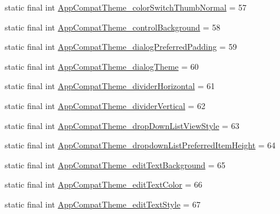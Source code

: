\begin{DoxyCompactItemize}
\item 
static final int \mbox{\hyperlink{classandroid_1_1support_1_1v7_1_1appcompat_1_1_r_1_1styleable_a4a54d43ed55ed2c6a48476ab524d2ec6}{App\+Compat\+Theme\+\_\+color\+Switch\+Thumb\+Normal}} = 57
\item 
static final int \mbox{\hyperlink{classandroid_1_1support_1_1v7_1_1appcompat_1_1_r_1_1styleable_a1459b42a4639cb7d3dee1500ad41f746}{App\+Compat\+Theme\+\_\+control\+Background}} = 58
\item 
static final int \mbox{\hyperlink{classandroid_1_1support_1_1v7_1_1appcompat_1_1_r_1_1styleable_ac445010ed6737b533f69751345cdacae}{App\+Compat\+Theme\+\_\+dialog\+Preferred\+Padding}} = 59
\item 
static final int \mbox{\hyperlink{classandroid_1_1support_1_1v7_1_1appcompat_1_1_r_1_1styleable_a811594124b056b626c7b3d35fe15c677}{App\+Compat\+Theme\+\_\+dialog\+Theme}} = 60
\item 
static final int \mbox{\hyperlink{classandroid_1_1support_1_1v7_1_1appcompat_1_1_r_1_1styleable_a98c967784babb8cbb86221b389f89c3d}{App\+Compat\+Theme\+\_\+divider\+Horizontal}} = 61
\item 
static final int \mbox{\hyperlink{classandroid_1_1support_1_1v7_1_1appcompat_1_1_r_1_1styleable_ace844d1c08d362d3e5c62f868ed46745}{App\+Compat\+Theme\+\_\+divider\+Vertical}} = 62
\item 
static final int \mbox{\hyperlink{classandroid_1_1support_1_1v7_1_1appcompat_1_1_r_1_1styleable_a2b86f5562d51fef86c35b13b2af3e180}{App\+Compat\+Theme\+\_\+drop\+Down\+List\+View\+Style}} = 63
\item 
static final int \mbox{\hyperlink{classandroid_1_1support_1_1v7_1_1appcompat_1_1_r_1_1styleable_adaed150cfd7b0ea3df5b4060d6e26849}{App\+Compat\+Theme\+\_\+dropdown\+List\+Preferred\+Item\+Height}} = 64
\item 
static final int \mbox{\hyperlink{classandroid_1_1support_1_1v7_1_1appcompat_1_1_r_1_1styleable_a0cafc06f0b9093a2445c09f136a53d76}{App\+Compat\+Theme\+\_\+edit\+Text\+Background}} = 65
\item 
static final int \mbox{\hyperlink{classandroid_1_1support_1_1v7_1_1appcompat_1_1_r_1_1styleable_a2de00e4c9241f547b3d4be6b640aba1b}{App\+Compat\+Theme\+\_\+edit\+Text\+Color}} = 66
\item 
static final int \mbox{\hyperlink{classandroid_1_1support_1_1v7_1_1appcompat_1_1_r_1_1styleable_a9ef732de87aea4df4b38e197f02c4b88}{App\+Compat\+Theme\+\_\+edit\+Text\+Style}} = 67
\item 

\end{DoxyCompactItemize}
